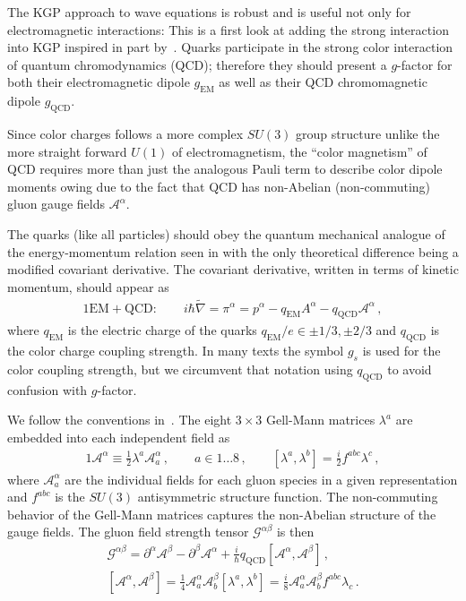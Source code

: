 The KGP approach to wave equations is robust and is useful not only for electromagnetic interactions: This is a first look at adding the strong interaction into KGP inspired in part by~\cite{Labun:2012ra}. Quarks participate in the strong color interaction of quantum chromodynamics (QCD); therefore they should present a $g$-factor for both their electromagnetic dipole $g_\mathrm{EM}$ as well as their QCD chromomagnetic dipole $g_\mathrm{QCD}$.

Since color charges follows a more complex $SU(3)$ group structure unlike the more straight forward $U(1)$ of electromagnetism, the ``color magnetism'' of QCD requires more than just the analogous Pauli term to describe color dipole moments owing due to the fact that QCD has non-Abelian (non-commuting) gluon gauge fields $\mathcal{A}^{\alpha}$.

The quarks (like all particles) should obey the quantum mechanical analogue of the energy-momentum relation seen in  with the only theoretical difference being a modified covariant derivative. The covariant derivative, written in terms of kinetic momentum, should appear as
\begin{alignat}{1}
    \label{eq:spin:08}
    \mathrm{EM+QCD}:\qquad i\hbar\widetilde\nabla=\pi^{\alpha}=p^{\alpha}-q_\mathrm{EM}A^{\alpha}-q_\mathrm{QCD}\mathcal{A}^{\alpha}\,,
\end{alignat}
where $q_\mathrm{EM}$ is the electric charge of the quarks $q_\mathrm{EM}/e\in\pm1/3,\pm2/3$ and $q_\mathrm{QCD}$ is the color charge coupling strength. In many texts the symbol $g_{s}$ is used for the color coupling strength, but we circumvent that notation using $q_\mathrm{QCD}$ to avoid confusion with $g$-factor.

We follow the conventions in~\cite{greiner2006qcd}. The eight $3\times3$ Gell-Mann matrices $\lambda^{a}$ are embedded into each independent field as
\begin{alignat}{1}
	\label{eq:spin:09} \mathcal{A}^{\alpha}\equiv\frac{1}{2}\lambda^{a}\mathcal{A}^{\alpha}_{a}\,,\qquad a\in1\ldots8\,,\qquad
    [\lambda^{a},\lambda^{b}]=\frac{i}{2}f^{abc}\lambda^{c}\,,
\end{alignat}
where $\mathcal{A}_{a}^{\alpha}$ are the individual fields for each gluon species in a given representation and $f^{abc}$ is the $SU(3)$ antisymmetric structure function. The non-commuting behavior of the Gell-Mann matrices captures the non-Abelian structure of the gauge fields. The gluon field strength tensor $\mathcal{G}^{\alpha\beta}$ is then
\begin{gather}
	\label{eq:spin:10a}
    \mathcal{G}^{\alpha\beta} = \partial^{\alpha}\mathcal{A}^{\beta} -\partial^{\beta}\mathcal{A}^{\alpha} + \frac{i}{\hbar}q_\mathrm{QCD}\left[\mathcal{A}^{\alpha},\mathcal{A}^{\beta}\right]\,,\\
	\label{eq:spin:10b} \left[\mathcal{A}^{\alpha},\mathcal{A}^{\beta}\right] =
    \frac{1}{4}\mathcal{A}^{\alpha}_{a}\mathcal{A}^{\beta}_{b}\left[\lambda^{a},\lambda^{b}\right] =
    \frac{i}{8}\mathcal{A}^{\alpha}_{a}\mathcal{A}^{\beta}_{b}f^{abc}\lambda_{c}\,.
\end{gather}


